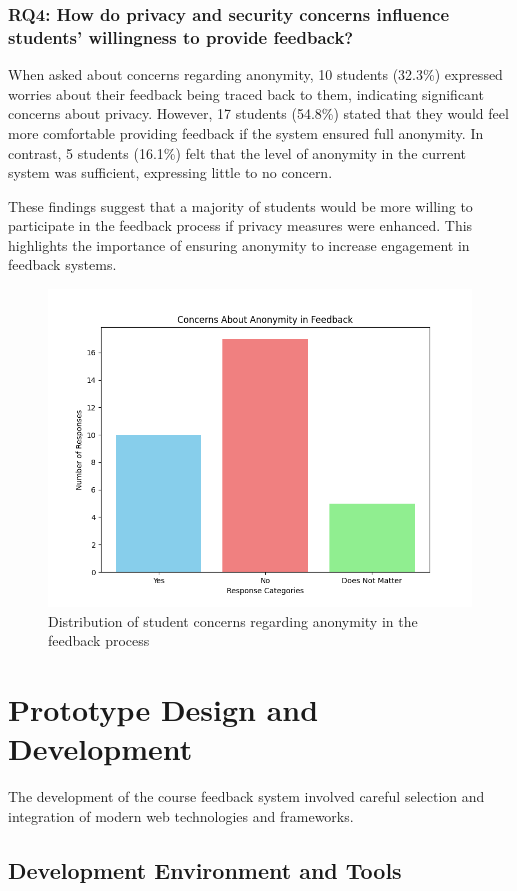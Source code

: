\documentclass[conference]{IEEEtran}
\begin{document}
\subsubsection{RQ4: How do privacy and security concerns influence students' willingness to provide feedback?}
When asked about concerns regarding anonymity, 10 students (32.3\%) expressed worries about their feedback being traced back to them, indicating significant concerns about privacy. However, 17 students (54.8\%) stated that they would feel more comfortable providing feedback if the system ensured full anonymity. In contrast, 5 students (16.1\%) felt that the level of anonymity in the current system was sufficient, expressing little to no concern. 

These findings suggest that a majority of students would be more willing to participate in the feedback process if privacy measures were enhanced. This highlights the importance of ensuring anonymity to increase engagement in feedback systems.
\begin{figure}[!htbp]
    \centering
    \includegraphics[width=0.8\linewidth]{feedback_anon.png} 
    \caption{Distribution of student concerns regarding anonymity in the feedback process}
    \label{fig:feedback_anon}
\end{figure}

\section{Prototype Design and Development}

The development of the course feedback system involved careful selection and integration of modern web technologies and frameworks.

\subsection{Development Environment and Tools}
\end{document}
